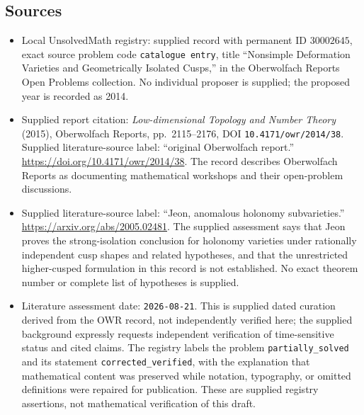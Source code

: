 \documentclass[11pt]{article}
\begin{document}
\subsection{Sources}
\begin{itemize}
\item Local UnsolvedMath registry: supplied record with permanent ID \(30002645\), exact source problem code \texttt{catalogue entry}, title ``Nonsimple Deformation Varieties and Geometrically Isolated Cusps,'' in the Oberwolfach Reports Open Problems collection. No individual proposer is supplied; the proposed year is recorded as 2014.
\item Supplied report citation: \emph{Low-dimensional Topology and Number Theory} (2015), Oberwolfach Reports, pp.\ 2115--2176, DOI \texttt{10.4171/owr/2014/38}. Supplied literature-source label: ``original Oberwolfach report.'' \url{https://doi.org/10.4171/owr/2014/38}. The record describes Oberwolfach Reports as documenting mathematical workshops and their open-problem discussions.
\item Supplied literature-source label: ``Jeon, anomalous holonomy subvarieties.'' \url{https://arxiv.org/abs/2005.02481}. The supplied assessment says that Jeon proves the strong-isolation conclusion for holonomy varieties under rationally independent cusp shapes and related hypotheses, and that the unrestricted higher-cusped formulation in this record is not established. No exact theorem number or complete list of hypotheses is supplied.
\item Literature assessment date: \texttt{2026-08-21}. This is supplied dated curation derived from the OWR record, not independently verified here; the supplied background expressly requests independent verification of time-sensitive status and cited claims. The registry labels the problem \texttt{partially\_solved} and its statement \texttt{corrected\_verified}, with the explanation that mathematical content was preserved while notation, typography, or omitted definitions were repaired for publication. These are supplied registry assertions, not mathematical verification of this draft.
\end{itemize}
\end{document}
